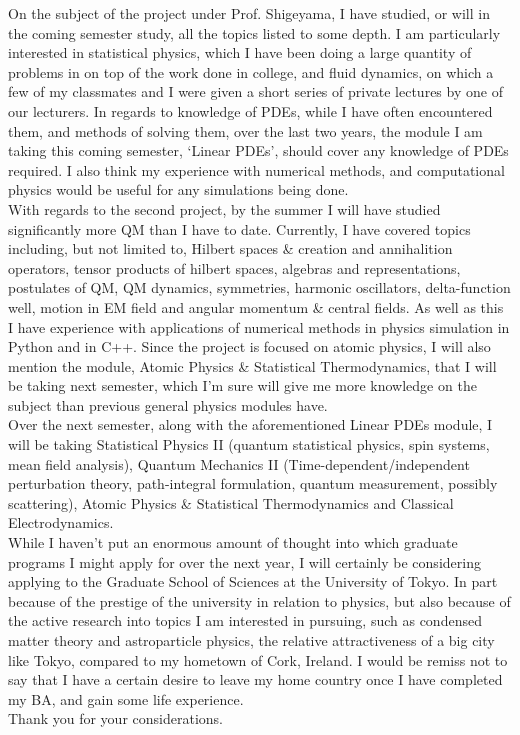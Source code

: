 \documentclass{article}
\theoremstyle{definition}
\theoremstyle{remark}
\begin{document}
\indent On the subject of the project under Prof. Shigeyama, I have studied, or will in the coming semester study, all the topics listed to some depth. I am particularly interested in statistical physics, which I have been doing a large quantity of problems in on top of the work done in college, and fluid dynamics, on which a few of my classmates and I were given a short series of private lectures by one of our lecturers. In regards to knowledge of PDEs, while I have often encountered them, and methods of solving them, over the last two years, the module I am taking this coming semester, `Linear PDEs', should cover any knowledge of PDEs required. I also think my experience with numerical methods, and computational physics would be useful for any simulations being done.\\
\indent With regards to the second project, by the summer I will have studied significantly more QM than I have to date. Currently, I have covered topics including, but not limited to, Hilbert spaces \& creation and annihalition operators, tensor products of hilbert spaces, algebras and representations, postulates of QM, QM dynamics, symmetries, harmonic oscillators, delta-function well, motion in EM field and angular momentum \& central fields. As well as this I have experience with applications of numerical methods in physics simulation in Python and in C++. Since the project is focused on atomic physics, I will also mention the module, Atomic Physics \& Statistical Thermodynamics, that I will be taking next semester, which I'm sure will give me more knowledge on the subject than previous general physics modules have.\\
\indent Over the next semester, along with the aforementioned Linear PDEs module, I will be taking Statistical Physics II (quantum statistical physics, spin systems, mean field analysis), Quantum Mechanics II (Time-dependent/independent perturbation theory, path-integral formulation, quantum measurement, possibly scattering), Atomic Physics \& Statistical Thermodynamics and Classical Electrodynamics.\\
\indent While I haven't put an enormous amount of thought into which graduate programs I might apply for over the next year, I will certainly be considering applying to the Graduate School of Sciences at the University of Tokyo. In part because of the prestige of the university in relation to physics, but also because of the active research into topics I am interested in pursuing, such as condensed matter theory and astroparticle physics, the relative attractiveness of a big city like Tokyo, compared to my hometown of Cork, Ireland. I would be remiss not to say that I have a certain desire to leave my home country once I have completed my BA, and gain some life experience.\\
\indent Thank you for your considerations.
\end{document}
